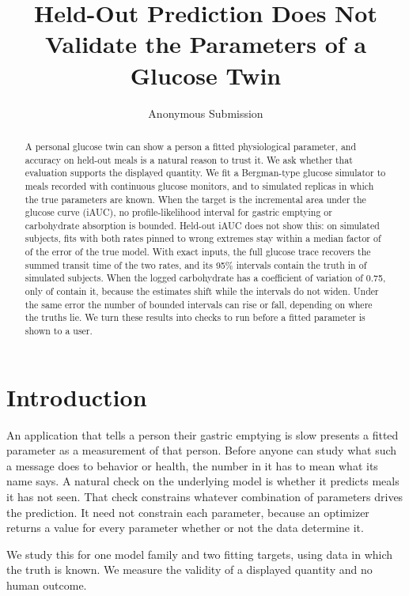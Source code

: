 \documentclass[letterpaper]{article} %
\title{Held-Out Prediction Does Not Validate the Parameters of a Glucose Twin}
\author{
    Anonymous Submission
}
\begin{document}
\maketitle

\begin{abstract}
A personal glucose twin can show a person a fitted physiological parameter, and accuracy on held-out meals is a natural reason to trust it. We ask whether that evaluation supports the displayed quantity. We fit a Bergman-type glucose simulator to meals recorded with continuous glucose monitors, and to simulated replicas in which the true parameters are known. When the target is the incremental area under the glucose curve (iAUC), no profile-likelihood interval for gastric emptying or carbohydrate absorption is bounded. Held-out iAUC does not show this: on simulated subjects, fits with both rates pinned to wrong extremes stay within a median factor of \resNegZeroFastRefitIauc{} of the error of the true model. With exact inputs, the full glucose trace recovers the summed transit time of the two rates, and its 95\% intervals contain the truth in \wsRandAZeroCover{} of \wsN{} simulated subjects. When the logged carbohydrate has a coefficient of variation of 0.75, only \wsRandAThreeQuarterCover{} of \wsN{} contain it, because the estimates shift while the intervals do not widen. Under the same error the number of bounded intervals can rise or fall, depending on where the truths lie. We turn these results into checks to run before a fitted parameter is shown to a user.
\end{abstract}

\section{Introduction}

An application that tells a person their gastric emptying is slow presents a fitted parameter as a measurement of that person. Before anyone can study what such a message does to behavior or health, the number in it has to mean what its name says. A natural check on the underlying model is whether it predicts meals it has not seen. That check constrains whatever combination of parameters drives the prediction. It need not constrain each parameter, because an optimizer returns a value for every parameter whether or not the data determine it.

We study this for one model family and two fitting targets, using data in which the truth is known. We measure the validity of a displayed quantity and no human outcome.
\end{document}
